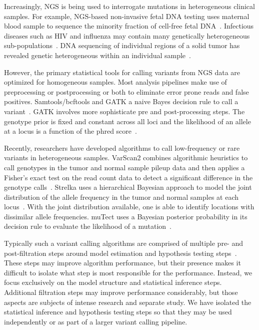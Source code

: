\documentclass[11pt,reqno]{amsart}
\begin{document}
Increasingly, NGS is being used to interrogate mutations in heterogeneous clinical samples. For example, NGS-based non-invasive fetal DNA testing uses maternal blood sample to sequence the minority fraction of cell-free fetal DNA~\citep{Fan:2008di}. Infectious diseases such as HIV and influenza may contain many genetically heterogeneous sub-populations~\citep{Flaherty:2011ja, Ghedin:2010ie}. DNA sequencing of individual regions of a solid tumor has revealed genetic heterogeneous within an individual sample~\citep{Navin:2010gu}.  

However, the primary statistical tools for calling variants from NGS data are optimized for homogeneous samples. Most analysis pipelines make use of preprocessing or postprocessing or both to eliminate error prone reads and false positives. Samtools/bcftools and GATK a naive Bayes decision rule to call a variant~\citep{}. GATK involves more sophisticate pre and post-processing steps. The genotype prior is fixed and constant across all loci and the likelihood of an allele at a locus is a function of the phred score~\citep{McKenna:2010bv}.

Recently, researchers have developed algorithms to call low-frequency or rare variants in heterogeneous samples.  VarScan2 combines algorithmic heuristics to call genotypes in the tumor and normal sample pileup data and then applies a Fisher's exact test on the read count data to detect a significant difference in the genotype calls~\citep{Koboldt:2012cg}. Strelka uses a hierarchical Bayesian approach to model the joint distribution of the allele frequency in the tumor and normal samples at each locus~\citep{Saunders:2012fh}. With the joint distribution available, one is able to identify locations with dissimilar allele frequencies. muTect uses a Bayesian posterior probability in its decision rule to evaluate the likelihood of a mutation~\citep{Cibulskis:2013ta}.

Typically such a variant calling algorithms are comprised of multiple pre- and post-filtration steps around model estimation and hypothesis testing steps~\citep{Pabinger:2013dl}. These steps may improve algorithm performance, but their presence makes it difficult to isolate what step is most responsible for the performance. Instead, we focus exclusively on the model structure and statistical inference steps. Additional filtration steps may improve performance considerably, but those aspects are subjects of intense research and separate study. We have isolated the statistical inference and hypothesis testing steps so that they may be used independently or as part of a larger variant calling pipeline.
\end{document}
